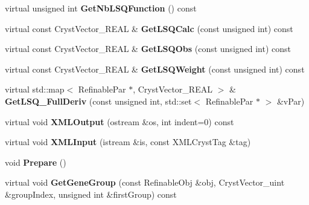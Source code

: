 \begin{DoxyCompactItemize}
virtual unsigned int {\bfseries Get\+Nb\+L\+S\+Q\+Function} () const
\item 
\mbox{\label{class_obj_cryst_1_1_powder_pattern_a75516c89d11ab872499ccabd17b05a47}} 
virtual const Cryst\+Vector\+\_\+\+R\+E\+AL \& {\bfseries Get\+L\+S\+Q\+Calc} (const unsigned int) const
\item 
\mbox{\label{class_obj_cryst_1_1_powder_pattern_a0a0fbc01b86b718323f55fcf721a849b}} 
virtual const Cryst\+Vector\+\_\+\+R\+E\+AL \& {\bfseries Get\+L\+S\+Q\+Obs} (const unsigned int) const
\item 
\mbox{\label{class_obj_cryst_1_1_powder_pattern_a2c1adddb9292458e6b93fd3862985622}} 
virtual const Cryst\+Vector\+\_\+\+R\+E\+AL \& {\bfseries Get\+L\+S\+Q\+Weight} (const unsigned int) const
\item 
\mbox{\label{class_obj_cryst_1_1_powder_pattern_a450df47c32994fafb3b6cc8d82f68d3e}} 
virtual std\+::map$<$ Refinable\+Par $\ast$, Cryst\+Vector\+\_\+\+R\+E\+AL $>$ \& {\bfseries Get\+L\+S\+Q\+\_\+\+Full\+Deriv} (const unsigned int, std\+::set$<$ Refinable\+Par $\ast$ $>$ \&v\+Par)
\item 
\mbox{\label{class_obj_cryst_1_1_powder_pattern_a640034a22ae65c6fc44159e12913ee09}} 
virtual void {\bfseries X\+M\+L\+Output} (ostream \&os, int indent=0) const
\item 
\mbox{\label{class_obj_cryst_1_1_powder_pattern_aa3f4ffe229e1727f7a922eaf18e5e7da}} 
virtual void {\bfseries X\+M\+L\+Input} (istream \&is, const X\+M\+L\+Cryst\+Tag \&tag)
\item 
\mbox{\label{class_obj_cryst_1_1_powder_pattern_ae03f4d2f08e749e4f494eb78050dbffe}} 
void {\bfseries Prepare} ()
\item 
\mbox{\label{class_obj_cryst_1_1_powder_pattern_aa9ad90bce792ecd69e97525ab7d93c1d}} 
virtual void {\bfseries Get\+Gene\+Group} (const Refinable\+Obj \&obj, Cryst\+Vector\+\_\+uint \&group\+Index, unsigned int \&first\+Group) const

\end{DoxyCompactItemize}
